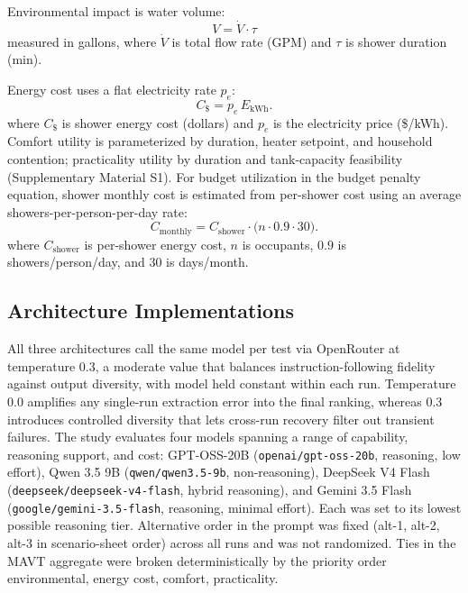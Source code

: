 \documentclass[a4paper,fleqn]{cas-dc}
\begin{document}
Environmental impact is water volume:
\begin{equation}
    V = \dot{V} \cdot \tau
    \label{eq:shower_volume}
\end{equation}
\noindent measured in gallons, where $\dot{V}$ is total flow rate (GPM) and $\tau$ is shower duration (min).

Energy cost uses a flat electricity rate $p_e$:
\begin{equation}
  C_{\$}=p_e\,E_{\mathrm{kWh}}.
  \label{eq:shower_cost}
\end{equation}
\noindent where $C_{\$}$ is shower energy cost (dollars) and $p_e$ is the electricity price (\$/kWh).
Comfort utility is parameterized by duration, heater setpoint, and household contention; practicality utility by duration and tank-capacity feasibility (Supplementary Material S1).
For budget utilization in the budget penalty equation, shower monthly cost is estimated from per-shower cost using an average showers-per-person-per-day rate:
\begin{equation}
  C_{\mathrm{monthly}} = C_{\mathrm{shower}} \cdot \bigl(n \cdot 0.9 \cdot 30\bigr).
  \label{eq:shower_monthly_cost}
\end{equation}
\noindent where $C_{\mathrm{shower}}$ is per-shower energy cost, $n$ is occupants, $0.9$ is showers/person/day, and $30$ is days/month.

\subsection{Architecture Implementations}
\label{sec:architectures}
All three architectures call the same model per test via OpenRouter at temperature 0.3, a moderate value that balances instruction-following fidelity against output diversity, with model held constant within each run.
Temperature 0.0 amplifies any single-run extraction error into the final ranking, whereas 0.3 introduces controlled diversity that lets cross-run recovery filter out transient failures. The study evaluates four models spanning a range of capability, reasoning support, and cost: GPT-OSS-20B (\texttt{openai/gpt-oss-20b}, reasoning, low effort), Qwen 3.5 9B (\texttt{qwen/qwen3.5-9b}, non-reasoning), DeepSeek V4 Flash (\texttt{deepseek/deepseek-v4-flash}, hybrid reasoning), and Gemini 3.5 Flash (\texttt{google/gemini-3.5-flash}, reasoning, minimal effort). Each was set to its lowest possible reasoning tier. Alternative order in the prompt was fixed (alt-1, alt-2, alt-3 in scenario-sheet order) across all runs and was not randomized. Ties in the MAVT aggregate were broken deterministically by the priority order environmental, energy cost, comfort, practicality.
\end{document}
